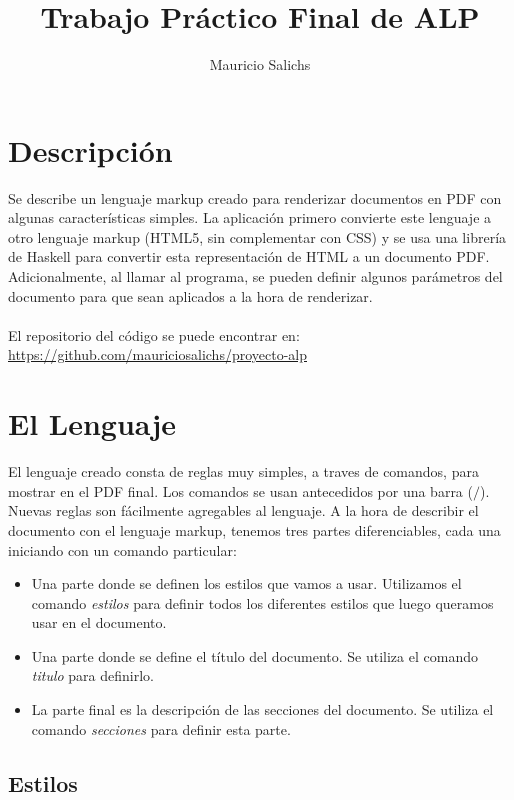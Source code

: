 \documentclass{article}
\title{Trabajo Práctico Final de ALP}
\author{Mauricio Salichs}
\date{}
\begin{document}
\maketitle

\section{Descripción}

Se describe un lenguaje markup creado para renderizar documentos en PDF con algunas características simples. La aplicación primero convierte este lenguaje a otro lenguaje markup (HTML5, sin complementar con CSS) y se usa una librería de Haskell para convertir esta representación de HTML a un documento PDF. Adicionalmente, al llamar al programa, se pueden definir algunos parámetros del documento para que sean aplicados a la hora de renderizar.
\\~\\
El repositorio del código se puede encontrar en:\\
\url{https://github.com/mauriciosalichs/proyecto-alp}

\section{El Lenguaje}
El lenguaje creado consta de reglas muy simples, a traves de comandos, para mostrar en el PDF final. Los comandos se usan antecedidos por una barra ($/$). Nuevas reglas son fácilmente agregables al lenguaje. A la hora de describir el documento con el lenguaje markup, tenemos tres partes diferenciables, cada una iniciando con un comando particular:
\begin{itemize}
    \item Una parte donde se definen los estilos que vamos a usar. Utilizamos el comando \emph{estilos} para definir todos los diferentes estilos que luego queramos usar en el documento.
    \item Una parte donde se define el título del documento. Se utiliza el comando \emph{titulo} para definirlo.
    \item La parte final es la descripción de las secciones del documento. Se utiliza el comando \emph{secciones} para definir esta parte.
\end{itemize}

\subsection{Estilos}
\end{document}
